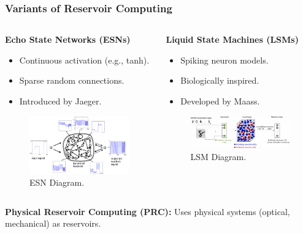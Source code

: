 \documentclass{beamer}
\begin{document}
\begin{frame}
    \frametitle{Variants of Reservoir Computing}
    \begin{columns}[T]
        \begin{column}{0.5\textwidth}
            \textbf{Echo State Networks (ESNs)}
            \begin{itemize}
                \item Continuous activation (e.g., tanh).
                \item Sparse random connections.
                \item Introduced by Jaeger.
            \end{itemize}
            \begin{figure}
                \includegraphics[width=\linewidth]{figures/ESN_diag_FreqGenSchema.png}
                \caption{ESN Diagram.}
            \end{figure}
        \end{column}
        \begin{column}{0.5\textwidth}
            \textbf{Liquid State Machines (LSMs)}
            \begin{itemize}
                \item Spiking neuron models.
                \item Biologically inspired.
                \item Developed by Maass.
            \end{itemize}
            \begin{figure}
                \includegraphics[width=\linewidth]{figures/lsm_diag.png}
                \caption{LSM Diagram.}
            \end{figure}
        \end{column}
    \end{columns}
    \pause\medskip
    \textbf{Physical Reservoir Computing (PRC):} Uses physical systems (optical, mechanical) as reservoirs.
\end{frame}
\end{document}

